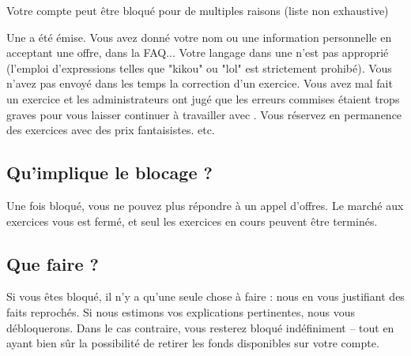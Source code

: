 ﻿Votre compte peut être bloqué pour de multiples raisons (liste non exhaustive)
\begin{itemize}
\li Une  a été émise. Vous avez donné votre nom ou une information personnelle en acceptant une offre, dans la FAQ...
\li Votre langage dans une  n'est pas approprié (l'emploi d'expressions telles que "kikou" ou "lol" est strictement prohibé).
\li Vous n'avez pas envoyé dans les temps la correction d'un exercice.
\li Vous avez mal fait un exercice et les administrateurs ont jugé que les erreurs commises étaient trops graves pour vous laisser continuer à travailler avec \eDevoir.
\li Vous réservez en permanence des exercices avec des prix fantaisistes.
\li etc.
\end{itemize}

\subsection{Qu'implique le blocage ?}
Une fois bloqué, vous ne pouvez plus répondre à un appel d'offres. Le marché aux exercices vous est fermé, et seul les exercices en cours peuvent être terminés.

\subsection{Que faire ?}
Si vous êtes bloqué, il n'y a qu'une seule chose à faire : nous  en vous justifiant des faits reprochés. Si nous estimons vos explications pertinentes, nous vous débloquerons. Dans le cas contraire, vous resterez bloqué indéfiniment -- tout en ayant bien sûr la possibilité de retirer les fonds disponibles sur votre compte.